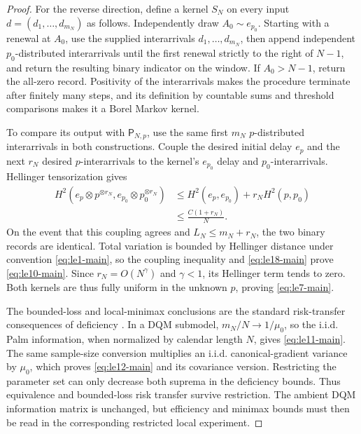 \begin{proof}
For the reverse direction, define a kernel \(S_N\) on every input
\(d=(d_1,\ldots,d_{m_N})\) as follows.  Independently draw
\(A_0\sim e_{p_0}\).  Starting with a renewal at \(A_0\), use the supplied
interarrivals \(d_1,\ldots,d_{m_N}\), then append independent
\(p_0\)-distributed interarrivals until the first renewal strictly to the
right of \(N-1\), and return the resulting binary indicator on the window.
If \(A_0>N-1\), return the all-zero record.  Positivity of the interarrivals
makes the procedure terminate after finitely many steps, and its definition
by countable sums and threshold comparisons makes it a Borel Markov kernel.

To compare its output with \(\mathsf P_{N,p}\), use the same first \(m_N\)
\(p\)-distributed interarrivals in both constructions.  Couple the desired
initial delay \(e_p\) and the next \(r_N\) desired \(p\)-interarrivals to
the kernel's \(e_{p_0}\) delay and \(p_0\)-interarrivals.  Hellinger
tensorization gives
\[
\begin{aligned}
 H^2(e_p\otimes p^{\otimes r_N},
     e_{p_0}\otimes p_0^{\otimes r_N})
 &\le H^2(e_p,e_{p_0})+r_NH^2(p,p_0)\\
 &\le \frac{C(1+r_N)}N.
\end{aligned}
\tag{LE18}\label{eq:le18-main}
\]
On the event that this coupling agrees and \(L_N\le m_N+r_N\), the two
binary records are identical.  Total variation is bounded by Hellinger
distance under convention \eqref{eq:le1-main}, so the coupling inequality and
\eqref{eq:le18-main} prove \eqref{eq:le10-main}.  Since
\(r_N=O(N^\gamma)\) and \(\gamma<1\), its Hellinger term tends to zero.
Both kernels are thus fully uniform in the unknown \(p\), proving
\eqref{eq:le7-main}.

The bounded-loss and local-minimax conclusions are the standard risk-transfer
consequences of deficiency \cite{LeCamYang2000}.  In a DQM submodel,
\(m_N/N\to1/\mu_0\), so the i.i.d. Palm information, when normalized by
calendar length \(N\), gives \eqref{eq:le11-main}.  The same sample-size
conversion multiplies an i.i.d. canonical-gradient variance by \(\mu_0\),
which proves \eqref{eq:le12-main} and its covariance version.  Restricting the
parameter set can only decrease both suprema in the deficiency bounds.
Thus equivalence and bounded-loss risk transfer survive restriction.  The
ambient DQM information matrix is unchanged, but efficiency and minimax bounds
must then be read in the corresponding restricted local experiment.
\end{proof}

